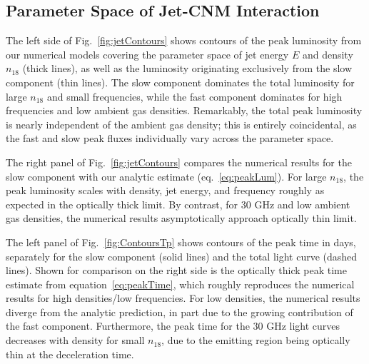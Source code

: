 \documentclass[usenatbib,fleqn]{mnras}
\begin{document}
\subsection{Parameter Space of Jet-CNM Interaction}
\label{sec:param}
The left side of Fig.~\ref{fig:jetContours} shows contours of the peak
luminosity from our numerical models covering the parameter space of
jet energy $E$ and density $n_{18}$ (thick lines), as well as the
luminosity originating exclusively from the slow component (thin
lines).  The slow component dominates the total luminosity for large
$n_{18}$ and small frequencies, while the fast component dominates for
high frequencies and low ambient gas densities.  Remarkably, the total
peak luminosity is nearly independent of the ambient gas density; this
is entirely coincidental, as the fast and slow peak fluxes
individually vary across the parameter space.

The right panel of Fig.~\ref{fig:jetContours} compares the numerical
results for the slow component with our analytic estimate
(eq.~\eqref{eq:peakLum}).  For large $n_{18}$, the peak luminosity
scales with density, jet energy, and frequency roughly as expected in
the optically thick limit.  By contrast, for 30 GHz and low ambient
gas densities, the numerical results asymptotically approach optically
thin limit.

The left panel of Fig.~\ref{fig:ContoursTp} shows contours of the peak
time in days, separately for the slow component (solid lines) and the
total light curve (dashed lines).  Shown for comparison on the right
side is the optically thick peak time estimate from
equation~\eqref{eq:peakTime}, which roughly reproduces the numerical
results for high densities/low frequencies. For low densities, the
numerical results diverge from the analytic prediction, in part due to
the growing contribution of the fast component.  Furthermore, the peak
time for the 30 GHz light curves decreases with density for small
$n_{18}$, due to the emitting region being optically thin at the
deceleration time.
\end{document}
